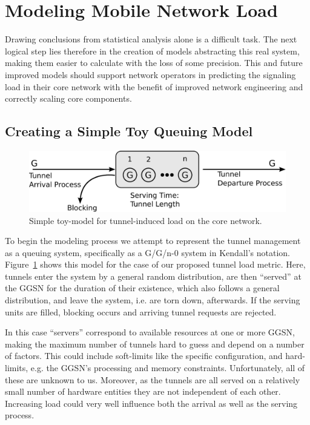 \section{Modeling Mobile Network Load}
\label{c4:sec:modeling}

Drawing conclusions from statistical analysis alone is a difficult task. The next logical step lies therefore in the creation of models abstracting this real system, making them easier to calculate with the loss of some precision. This and future improved models should support network operators in predicting the signaling load in their core network with the benefit of improved network engineering and correctly scaling core components.


\subsection{Creating a Simple Toy Queuing Model}

\begin{figure}
	\centering
	\includegraphics[width=\columnwidth]{images/IMC2013/GGn-model.pdf}
	\caption{Simple toy-model for tunnel-induced load on the core network.}
	\label{fig:ggn-model}
\end{figure}

To begin the modeling process we attempt to represent the tunnel management as a queuing system, specifically as a G/G/n-0 system in Kendall's notation. Figure~\ref{fig:ggn-model} shows this model for the case of our proposed tunnel load metric. Here, tunnels enter the system by a general random distribution, are then ``served'' at the \ac{GGSN} for the duration of their existence, which also follows a general distribution, and leave the system, i.e. are torn down, afterwards. If the serving units are filled, blocking occurs and arriving tunnel requests are rejected.

In this case ``servers'' correspond to available resources at one or more \ac{GGSN}, making the maximum number of tunnels hard to guess and depend on a number of factors. This could include soft-limits like the specific configuration, and hard-limits, e.g. the \ac{GGSN}'s processing and memory constraints. Unfortunately, all of these are unknown to us. Moreover, as the tunnels are all served on a relatively small number of hardware entities they are not independent of each other. Increasing load could very well influence both the arrival as well as the serving process.

